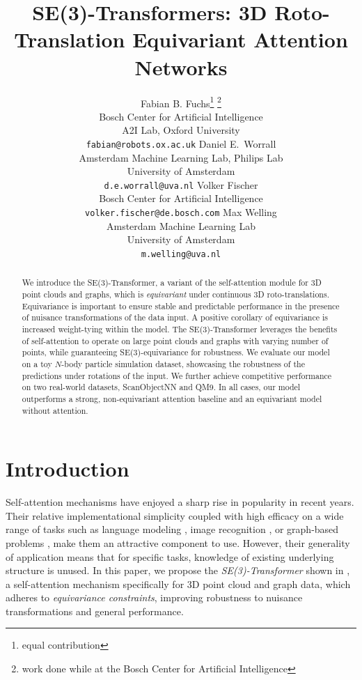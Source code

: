 \documentclass{article}
\title{SE(3)-Transformers: 3D Roto-Translation Equivariant Attention Networks}
\author{
  Fabian B. Fuchs\thanks{equal contribution}$\,\,$\thanks{work done while at the Bosch Center for Artificial Intelligence} \\
  Bosch Center for Artificial Intelligence\\
  A2I Lab, Oxford University\\
  \texttt{fabian@robots.ox.ac.uk}
  \And
  Daniel E.~Worrall\printfnsymbol{1}\\
  Amsterdam Machine Learning Lab, Philips Lab\\
  University of Amsterdam\\
  \texttt{d.e.worrall@uva.nl} 
  \And
  Volker Fischer\\
  Bosch Center for Artificial Intelligence \\
  \texttt{volker.fischer@de.bosch.com}
  \And Max Welling \\
  $\quad\quad\,\,$ Amsterdam Machine Learning Lab $\quad\quad\,\,$ \\
  University of Amsterdam \\
  \texttt{m.welling@uva.nl}
}
\begin{document}

\maketitle

\begin{abstract}
We introduce the SE(3)-Transformer, a variant of the self-attention module for 3D point clouds and graphs, which is \emph{equivariant} under continuous 3D roto-translations. Equivariance is important to ensure stable and predictable performance in the presence of nuisance transformations of the data input. A positive corollary of equivariance is increased weight-tying within the model. The SE(3)-Transformer leverages the benefits of self-attention to operate on large point clouds and graphs with varying number of points, while guaranteeing SE(3)-equivariance for robustness. We evaluate our model on a toy $N$-body particle simulation dataset, showcasing the robustness of the predictions under rotations of the input. We further achieve competitive performance on two real-world datasets, ScanObjectNN and QM9. In all cases, our model outperforms a strong, non-equivariant attention baseline and an equivariant model without attention.
\end{abstract}

\section{Introduction}

Self-attention mechanisms \citep{VaswaniSPUJGKP17} have enjoyed a sharp rise in popularity in recent years. Their relative implementational simplicity coupled with high efficacy on a wide range of tasks such as language modeling \citep{VaswaniSPUJGKP17}, image recognition \citep{ParmarRVBLS19}, or graph-based problems \citep{VelikovicCCRLB2017}, make them an attractive component to use. However, their generality of application means that for specific tasks, knowledge of existing underlying structure is unused. In this paper, we propose the \emph{SE(3)-Transformer} shown in , a self-attention mechanism specifically for 3D point cloud and graph data, which adheres to \emph{equivariance constraints}, improving robustness to nuisance transformations and general performance.
\end{document}
